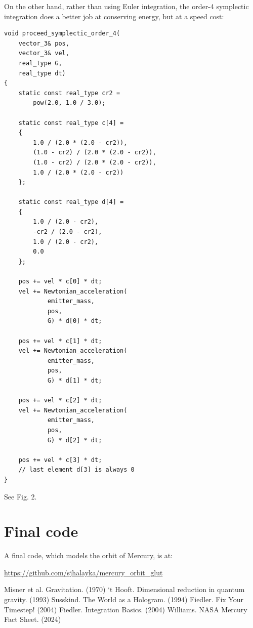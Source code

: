 \documentclass[12pt]{article}
\begin{document}
On the other hand, rather than using Euler integration, the order-4 symplectic integration does a better job at conserving energy, but at a speed cost:
\begin{lstlisting}
void proceed_symplectic_order_4(
	vector_3& pos, 
	vector_3& vel, 
	real_type G, 
	real_type dt)
{
	static const real_type cr2 = 
		pow(2.0, 1.0 / 3.0);

	static const real_type c[4] =
	{
		1.0 / (2.0 * (2.0 - cr2)),
		(1.0 - cr2) / (2.0 * (2.0 - cr2)),
		(1.0 - cr2) / (2.0 * (2.0 - cr2)),
		1.0 / (2.0 * (2.0 - cr2))
	};

	static const real_type d[4] =
	{
		1.0 / (2.0 - cr2),
		-cr2 / (2.0 - cr2),
		1.0 / (2.0 - cr2),
		0.0
	};

	pos += vel * c[0] * dt;
	vel += Newtonian_acceleration(
			emitter_mass, 
			pos, 
			G) * d[0] * dt;

	pos += vel * c[1] * dt;
	vel += Newtonian_acceleration(
			emitter_mass, 
			pos, 
			G) * d[1] * dt;

	pos += vel * c[2] * dt;
	vel += Newtonian_acceleration(
			emitter_mass, 
			pos, 
			G) * d[2] * dt;

	pos += vel * c[3] * dt;
	// last element d[3] is always 0
}
\end{lstlisting}

See Fig. 2.







\section{Final code}

A final code, which models the orbit of Mercury, is at:

\url{https://github.com/sjhalayka/mercury_orbit_glut}





\begin{thebibliography}{9}

 Misner et al. Gravitation. (1970)
 `t Hooft. Dimensional reduction in quantum gravity. (1993)
 Susskind. The World as a Hologram. (1994)
 Fiedler. Fix Your Timestep! (2004)
 Fiedler. Integration Basics. (2004)
 Williams. NASA Mercury Fact Sheet. (2024)

\end{thebibliography}
\end{document}
